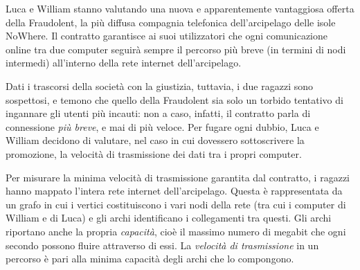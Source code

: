 \usepackage{xcolor}
\usepackage{afterpage}
\usepackage{pifont,mdframed}
\usepackage[bottom]{footmisc}
\usepackage{subcaption}


\makeatletter
\gdef\this@inputfilename{input.txt}
\gdef\this@outputfilename{output.txt}
\makeatother

\newenvironment{warning}
  {\par\begin{mdframed}[linewidth=2pt,linecolor=gray]%
    \begin{list}{}{\leftmargin=1cm
                   \labelwidth=\leftmargin}\item[\Large\ding{43}]}
  {\end{list}\end{mdframed}\par}

\newcommand{\inputfile}{\texttt{input.txt}}
\newcommand{\outputfile}{\texttt{output.txt}}


Luca e William stanno valutando una nuova e apparentemente vantaggiosa offerta della Fraudolent, la più diffusa compagnia telefonica dell'arcipelago delle isole NoWhere. Il contratto garantisce ai suoi utilizzatori che ogni comunicazione online tra due computer seguirà sempre il percorso più breve (in termini di nodi intermedi) all'interno della rete internet dell'arcipelago.

Dati i trascorsi della società con la giustizia, tuttavia, i due ragazzi sono sospettosi, e temono che quello della Fraudolent sia solo un torbido tentativo di ingannare gli utenti più incauti: non a caso, infatti, il contratto parla di connessione \emph{più breve}, e mai di più veloce. Per fugare ogni dubbio, Luca e William decidono di valutare, nel caso in cui dovessero sottoscrivere la promozione, la velocità di trasmissione dei dati tra i propri computer.

Per misurare la minima velocità di trasmissione garantita dal contratto, i ragazzi hanno mappato l'intera rete internet dell'arcipelago. Questa è rappresentata da un grafo in cui i vertici costituiscono i vari nodi della rete (tra cui i computer di William e di Luca) e gli archi identificano i collegamenti tra questi. Gli archi riportano anche la propria \emph{capacità}, cioè il massimo numero di megabit che ogni secondo possono fluire attraverso di essi. La \emph{velocità di trasmissione} in un percorso è pari alla minima capacità degli archi che lo compongono.

